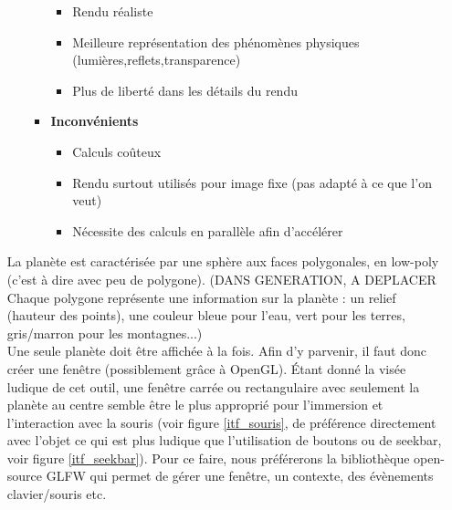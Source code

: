 \documentclass[a4paper]{article}
\begin{document}
\begin{enumerate}
\begin{itemize}
\begin{itemize}
\begin{itemize}
                    \item Rendu réaliste
                    \item Meilleure représentation des phénomènes physiques (lumières,reflets,transparence)
                    \item Plus de liberté dans les détails du rendu
                \end{itemize}
                \item  \textbf{Inconvénients}
                \begin{itemize}
                    \item Calculs coûteux 
                    \item Rendu surtout utilisés pour image fixe (pas adapté à ce que l'on veut)
                    \item Nécessite des calculs en parallèle afin d'accélérer
                \end{itemize}
            \end{itemize}
            
            
        \end{itemize}
        La planète est caractérisée par une sphère aux faces polygonales, en low-poly (c'est à dire avec peu de polygone). (DANS GENERATION, A DEPLACER Chaque polygone représente une information sur la planète : un relief (hauteur des points), une couleur bleue pour l'eau, vert pour les terres, gris/marron pour les montagnes...)\\
        
        Une seule planète doit être affichée à la fois. Afin d'y parvenir, il faut donc créer une fenêtre (possiblement grâce à OpenGL). Étant donné la visée ludique de cet outil, une fenêtre carrée ou rectangulaire avec seulement la planète au centre semble être le plus approprié pour l'immersion et l'interaction avec la souris (voir figure \ref{itf_souris}, de préférence directement avec l'objet ce qui est plus ludique que l'utilisation de boutons ou de seekbar, voir figure \ref{itf_seekbar}). Pour ce faire, nous préférerons la bibliothèque open-source GLFW qui permet de gérer une fenêtre, un contexte, des évènements clavier/souris etc.\\
  

\end{enumerate}
\end{document}

